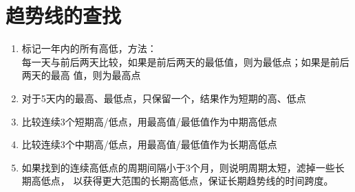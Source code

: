 \chapter{趋势线的查找}

\begin{enumerate}
\item 标记一年内的所有高低，方法： \\
  每一天与前后两天比较，如果是前后两天的最低值，则为最低点；如果是前后两天的最高
  值，则为最高点
\item 对于5天内的最高、最低点，只保留一个，结果作为短期的高、低点
\item 比较连续3个短期高/低点，用最高值/最低值作为中期高低点
\item 比较连续3个中期高/低点，用最高值/最低值作为长期高低点
\item 如果找到的连续高低点的周期间隔小于3个月，则说明周期太短，滤掉一些长期高低点，
  以获得更大范围的长期高低点，保证长期趋势线的时间跨度。
\end{enumerate}


